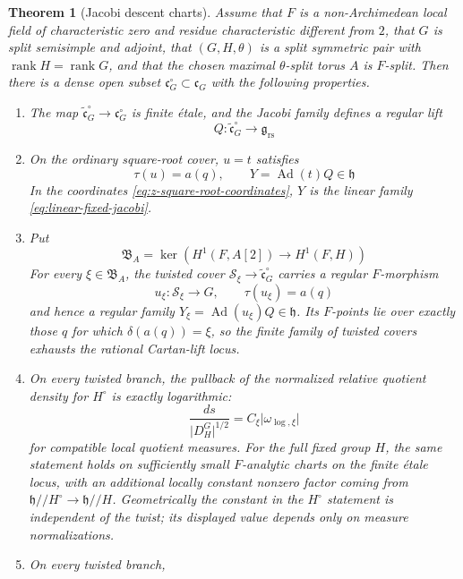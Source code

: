 \documentclass[11pt]{amsart}
\newtheorem{theorem}{Theorem}[section]
\theoremstyle{definition}
\theoremstyle{remark}
\newcommand{\cS}{\mathcal S}
\newcommand{\Ad}{\operatorname{Ad}}
\newcommand{\rank}{\operatorname{rank}}
\newcommand{\cC}{\mathfrak c}
\newcommand{\abs}[1]{\lvert #1\rvert}
\newcommand{\g}{\mathfrak g}
\newcommand{\h}{\mathfrak h}
\begin{document}
\begin{theorem}[Jacobi descent charts]\label{thm:descent-charts}
Assume that $F$ is a non-Archimedean local field of characteristic zero and
residue characteristic different from $2$, that $G$ is split semisimple and
adjoint, that $(G,H,\theta)$ is a split symmetric pair with
$\rank H=\rank G$, and that the chosen maximal $\theta$-split torus $A$ is
$F$-split.  Then there is a dense open subset
$\cC_G^\circ\subset\cC_G$ with the following properties.
\begin{enumerate}[label=\textup{(\alph*)},leftmargin=2.3em]
\item The map
      $\widetilde{\cC}_G^\circ\to\cC_G^\circ$ is finite \'etale, and the
      Jacobi family defines a regular lift
      \[
       Q:\widetilde{\cC}_G^\circ\longrightarrow\g_{\mathrm{rs}}
\]
\item On the ordinary square-root cover, $u=t$ satisfies
      \[
       \tau(u)=a(q),\qquad Y=\Ad(t)Q\in\h
\]
      In the coordinates \eqref{eq:z-square-root-coordinates}, $Y$ is the
      linear family \eqref{eq:linear-fixed-jacobi}.
\item Put
      \[
       \mathfrak B_A=
       \ker\left(H^1(F,A[2])\longrightarrow H^1(F,H)\right)
\]
      For every $\xi\in\mathfrak B_A$, the twisted cover
      $\cS_\xi\to\widetilde{\cC}_G^\circ$ carries a regular $F$-morphism
      \[
       u_\xi:\cS_\xi\longrightarrow G,
       \qquad \tau(u_\xi)=a(q)
\]
      and hence a regular family $Y_\xi=\Ad(u_\xi)Q\in\h$.  Its $F$-points
      lie over exactly those $q$ for which $\delta(a(q))=\xi$, so the finite
      family of twisted covers exhausts the rational Cartan-lift locus.
\item On every twisted branch, the pullback of the normalized relative
      quotient density for $H^\circ$ is exactly logarithmic:
      \begin{equation}\label{eq:twisted-log-density}
       \frac{ds}{\abs{D_H^G}^{1/2}}
       =C_\xi\abs{\omega_{\log,\xi}}
\end{equation}
      for compatible local quotient measures.  For the full fixed group $H$,
      the same statement holds on sufficiently small $F$-analytic charts on
      the finite \'etale locus, with an additional locally constant
      nonzero factor coming from
      $\h/\!/H^\circ\to\h/\!/H$.  Geometrically the constant in the
      $H^\circ$ statement is independent of the twist; its displayed value
      depends only on measure normalizations.
\item On every twisted branch,

\end{enumerate}
\end{theorem}
\end{document}
